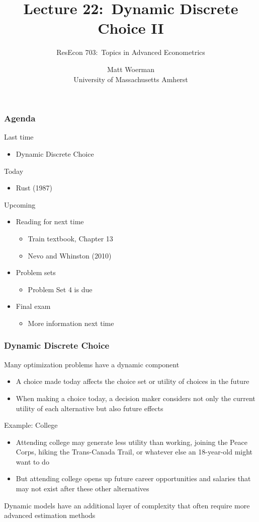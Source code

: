 \documentclass{beamer}
\title[Lecture 22:\ Dynamic Discrete Choice II]{Lecture 22:\ Dynamic Discrete Choice II}
\author[ResEcon 703:\ Advanced Econometrics]{ResEcon 703:\ Topics in Advanced Econometrics}
\date{Matt Woerman\\University of Massachusetts Amherst}
\begin{document}
{ 
\begin{frame}[noframenumbering]
    \titlepage
\end{frame}
}

\begin{frame}\frametitle{Agenda}
    Last time
    \begin{itemize}
        \item Dynamic Discrete Choice
    \end{itemize}
    \vspace{2ex}
    Today
    \begin{itemize}
        \item Rust (1987)
    \end{itemize}
    \vspace{2ex}
    Upcoming
    \begin{itemize}
        \item Reading for next time
        \begin{itemize}
            \item Train textbook, Chapter 13
            \item Nevo and Whinston (2010)
        \end{itemize}
        \item Problem sets
        \begin{itemize}
            \item Problem Set 4 is due
        \end{itemize}
        \item Final exam
        \begin{itemize}
        	\item More information next time
        \end{itemize}
    \end{itemize}
\end{frame}

\begin{frame}\frametitle{Dynamic Discrete Choice}
    Many optimization problems have a dynamic component
    \begin{itemize}
    	\item A choice made today affects the choice set or utility of choices in the future
    	\item When making a choice today, a decision maker considers not only the current utility of each alternative but also future effects
    \end{itemize}
    \vspace{2ex}
    Example: College
    \begin{itemize}
    	\item Attending college may generate less utility than working, joining the Peace Corps, hiking the Trans-Canada Trail, or whatever else an 18-year-old might want to do
    	\item But attending college opens up future career opportunities and salaries that may not exist after these other alternatives
    \end{itemize}
    \vspace{2ex}
    Dynamic models have an additional layer of complexity that often require more advanced estimation methods
\end{frame}
\end{document}
